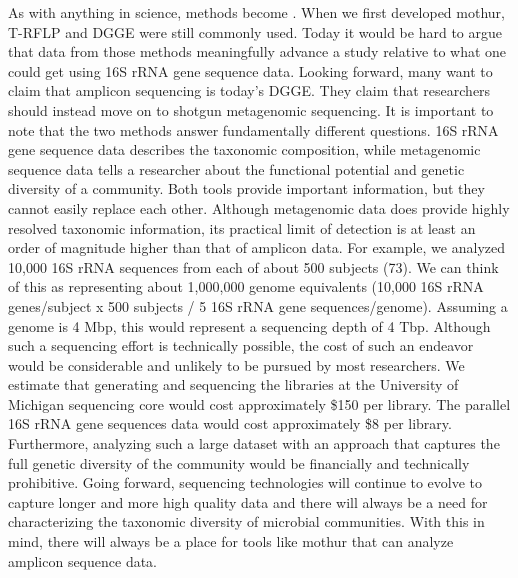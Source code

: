 \documentclass[11pt,]{article}
\begin{document}
As with anything in science, methods become . When we
first developed mothur, T-RFLP and DGGE were still commonly used. Today
it would be hard to argue that data from those methods meaningfully
advance a study relative to what one could get using 16S rRNA gene
sequence data. Looking forward, many want to claim that amplicon
sequencing is today's DGGE. They claim that researchers should instead
move on to shotgun metagenomic sequencing. It is important to note that
the two methods answer fundamentally different questions. 16S rRNA gene
sequence data describes the taxonomic composition, while metagenomic
sequence data tells a researcher about the functional potential and
genetic diversity of a community. Both tools provide important
information, but they cannot easily replace each other. Although
metagenomic data does provide highly resolved taxonomic information, its
practical limit of detection is at least an order of magnitude higher
than that of amplicon data. For example, we analyzed 10,000 16S rRNA
sequences from each of about 500 subjects (73). We can think of this as
representing about 1,000,000 genome equivalents (10,000 16S rRNA
genes/subject x 500 subjects / 5 16S rRNA gene sequences/genome).
Assuming a genome is 4 Mbp, this would represent a sequencing depth of 4
Tbp. Although such a sequencing effort is technically possible, the cost
of such an endeavor would be considerable and unlikely to be pursued by
most researchers. We estimate that generating and sequencing the
libraries at the University of Michigan sequencing core would cost
approximately \$150 per library. The parallel 16S rRNA gene sequences
data would cost approximately \$8 per library. Furthermore, analyzing
such a large dataset with an approach that captures the full genetic
diversity of the community would be financially and technically
prohibitive. Going forward, sequencing technologies will continue to
evolve to capture longer and more high quality data and there will
always be a need for characterizing the taxonomic diversity of microbial
communities. With this in mind, there will always be a place for tools
like mothur that can analyze amplicon sequence data.
\end{document}
